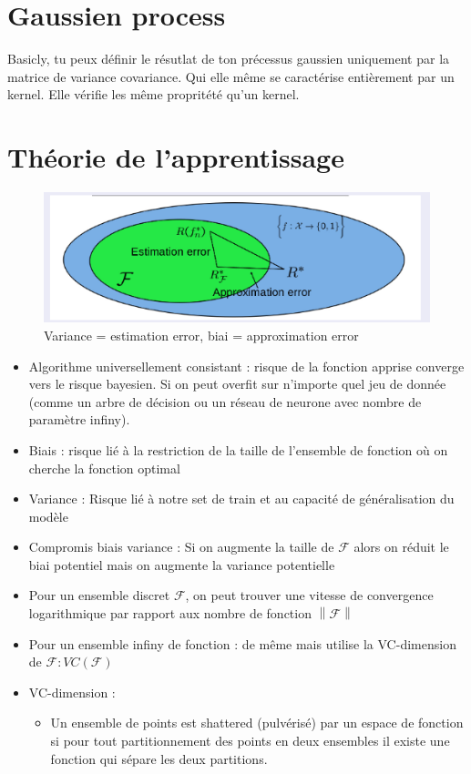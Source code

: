\documentclass{article}
\begin{document}
\begin{multicols}{2}
\section{Gaussien process}
Basicly, tu peux définir le résutlat de ton précessus gaussien uniquement par la matrice de variance covariance. Qui elle même se caractérise entièrement par un kernel. Elle vérifie les même propritété qu'un kernel.


\section{Théorie de l'apprentissage}
\begin{figure}[!htbp]
    \centering
    \includegraphics*[width=.65\textwidth]{biais-variance.png}
    \caption{Variance = estimation error, biai = approximation error}
    \label{<label>}
\end{figure}
\begin{itemize}
    \item Algorithme universellement consistant : risque de la fonction apprise converge vers le risque bayesien. Si on peut overfit sur n'importe quel jeu de donnée (comme un arbre de décision ou un réseau de neurone avec nombre de paramètre infiny).
    \item Biais : risque lié à la restriction de la taille de l'ensemble de fonction où on cherche la fonction optimal
    \item Variance : Risque lié à notre set de train et au capacité de généralisation du modèle
    \item Compromis biais variance : Si on augmente la taille de $\mathcal{F}$ alors on réduit le biai potentiel mais on augmente la variance potentielle
    \item Pour un ensemble discret $ \mathcal{F} $, on peut trouver une vitesse de convergence logarithmique par rapport aux nombre de fonction $ \left\| \mathcal{F} \right\|  $ 
    \item Pour un ensemble infiny de fonction : de même mais utilise la VC-dimension de $ \mathcal{F} : VC(\mathcal{F}) $ 
    \item VC-dimension : \begin{itemize}
        \item Un ensemble de points est shattered (pulvérisé) par un espace de fonction si pour tout partitionnement des points en deux ensembles il existe une fonction qui sépare les deux partitions.

\end{itemize}
\end{itemize}
\end{multicols}
\end{document}
